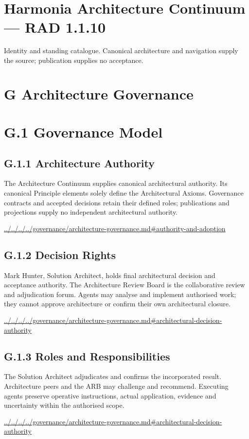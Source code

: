 \documentclass[10pt,a4paper]{article}
\begin{document}
\section*{Harmonia Architecture Continuum — RAD 1.1.10}
Identity and standing catalogue. Canonical architecture and navigation supply the source; publication supplies no acceptance.\par
\section*{G Architecture Governance}
\section*{G.1 Governance Model}
\subsection*{G.1.1 Architecture Authority}
The Architecture Continuum supplies canonical architectural authority. Its canonical Principle elements solely define the Architectural Axioms. Governance contracts and accepted decisions retain their defined roles; publications and projections supply no independent architectural authority.\par
{\footnotesize\url{../../../../governance/architecture-governance.md#authority-and-adoption}}\par
\subsection*{G.1.2 Decision Rights}
Mark Hunter, Solution Architect, holds final architectural decision and acceptance authority. The Architecture Review Board is the collaborative review and adjudication forum. Agents may analyse and implement authorised work; they cannot approve architecture or confirm their own architectural closure.\par
{\footnotesize\url{../../../../governance/architecture-governance.md#architectural-decision-authority}}\par
\subsection*{G.1.3 Roles and Responsibilities}
The Solution Architect adjudicates and confirms the incorporated result. Architecture peers and the ARB may challenge and recommend. Executing agents preserve operative instructions, actual application, evidence and uncertainty within the authorised scope.\par
{\footnotesize\url{../../../../governance/architecture-governance.md#architectural-decision-authority}}\par
\end{document}
